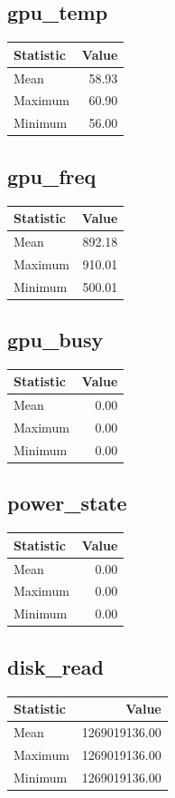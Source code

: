 \documentclass[11pt]{article}
\begin{document}
\subsection{gpu_temp}
\begin{tabular}{lr}
\toprule
Statistic & Value \\
\midrule
Mean & 58.93 \\
Maximum & 60.90 \\
Minimum & 56.00 \\
\bottomrule
\end{tabular}


\subsection{gpu_freq}
\begin{tabular}{lr}
\toprule
Statistic & Value \\
\midrule
Mean & 892.18 \\
Maximum & 910.01 \\
Minimum & 500.01 \\
\bottomrule
\end{tabular}


\subsection{gpu_busy}
\begin{tabular}{lr}
\toprule
Statistic & Value \\
\midrule
Mean & 0.00 \\
Maximum & 0.00 \\
Minimum & 0.00 \\
\bottomrule
\end{tabular}


\subsection{power_state}
\begin{tabular}{lr}
\toprule
Statistic & Value \\
\midrule
Mean & 0.00 \\
Maximum & 0.00 \\
Minimum & 0.00 \\
\bottomrule
\end{tabular}


\subsection{disk_read}
\begin{tabular}{lr}
\toprule
Statistic & Value \\
\midrule
Mean & 1269019136.00 \\
Maximum & 1269019136.00 \\
Minimum & 1269019136.00 \\
\bottomrule
\end{tabular}
\end{document}

